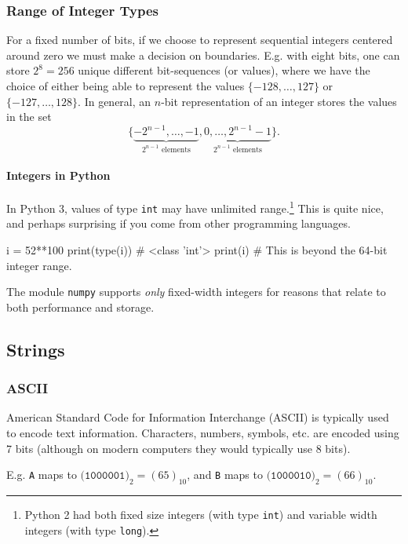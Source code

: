 \documentclass[12pt,letterpaper,twoside]{article}
\begin{document}
\subsubsection{Range of Integer Types}
For a fixed number of bits, if we choose to represent sequential
integers centered around zero we must make a decision on boundaries.
E.g. with eight bits, one can store
$2^8 = 256$ unique different bit-sequences (or values), where we have the choice of
either being able to represent the values $\{-128, \ldots, 127\}$ or
$\{-127, \ldots, 128\}$. In general, an $n$-bit representation of an
integer stores the values in the set
\[
  \{\underbrace{-2^{n-1}, \ldots, -1}_{2^{n-1} \textrm{ elements}}, \underbrace{0,
  \ldots, 2^{n-1} - 1}_{2^{n-1} \textrm{ elements}}\}.
\]

\paragraph{Integers in Python}

In Python 3, values of type \texttt{int} may have unlimited
range.\footnote{Python 2 had both fixed size integers (with type \texttt{int}) and
  variable width integers (with type \texttt{long}).}
This is quite nice, and perhaps surprising if you come from
other programming languages.

\begin{python}[basicstyle=\small]
i = 52**100
print(type(i))   # <class 'int'>
print(i)         # This is beyond the 64-bit integer range.
\end{python}

The module \texttt{numpy} supports \emph{only} fixed-width integers
for reasons that relate to both performance and storage.

\subsection{Strings}

\subsubsection{ASCII}
American Standard Code for Information Interchange (ASCII) is
typically used to encode text information.
Characters, numbers, symbols, etc. are encoded using 7 bits (although
on modern computers they would typically use 8 bits).

E.g. \texttt{A} maps to $\texttt{(1000001)}_2 = (65)_{10}$,
and \texttt{B} maps to $\texttt{(1000010)}_2 = (66)_{10}$.
\end{document}
